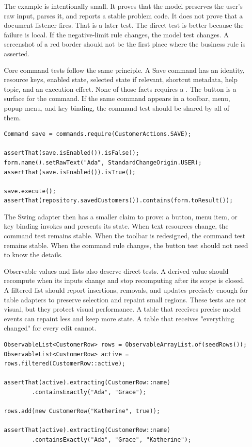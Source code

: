 The example is intentionally small. It proves that the model preserves the user's raw input, parses it, and reports a stable problem code. It does not prove that a  document listener fires. That is a later test. The direct test is better because the failure is local. If the negative-limit rule changes, the model test changes. A screenshot of a red border should not be the first place where the business rule is asserted.

Core command tests follow the same principle. A Save command has an identity, resource keys, enabled state, selected state if relevant, shortcut metadata, help topic, and an execution effect. None of those facts requires a . The button is a surface for the command. If the same command appears in a toolbar, menu, popup menu, and key binding, the command test should be shared by all of them.

\begin{lstlisting}[caption={Testing command state by action identity.}]
Command save = commands.require(CustomerActions.SAVE);

assertThat(save.isEnabled()).isFalse();
form.name().setRawText("Ada", StandardChangeOrigin.USER);
assertThat(save.isEnabled()).isTrue();

save.execute();
assertThat(repository.savedCustomers()).contains(form.toResult());
\end{lstlisting}

The Swing adapter then has a smaller claim to prove: a button, menu item, or key binding invokes  and presents its state. When text resources change, the command test remains stable. When the toolbar is redesigned, the command test remains stable. When the command rule changes, the button test should not need to know the details.

Observable values and lists also deserve direct tests. A derived value should recompute when its inputs change and stop recomputing after its scope is closed. A filtered list should report insertions, removals, and updates precisely enough for table adapters to preserve selection and repaint small regions. These tests are not visual, but they protect visual performance. A table that receives precise model events can repaint less and keep more state. A table that receives "everything changed" for every edit cannot.

\begin{lstlisting}[caption={Testing an observable list transformation.}]
ObservableList<CustomerRow> rows = ObservableArrayList.of(seedRows());
ObservableList<CustomerRow> active = rows.filtered(CustomerRow::active);

assertThat(active).extracting(CustomerRow::name)
        .containsExactly("Ada", "Grace");

rows.add(new CustomerRow("Katherine", true));

assertThat(active).extracting(CustomerRow::name)
        .containsExactly("Ada", "Grace", "Katherine");
\end{lstlisting}

